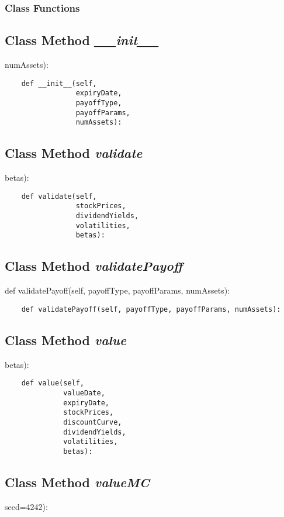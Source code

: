 \documentclass[twoside,11pt]{book}
\begin{document}
\subsubsection{Class Functions}

\subsection{Class Method {\it \_\_init\_\_}}
numAssets):

\begin{lstlisting}
    def __init__(self,
                 expiryDate,
                 payoffType,
                 payoffParams,
                 numAssets):
\end{lstlisting}

\subsection{Class Method {\it validate}}
betas):

\begin{lstlisting}
    def validate(self,
                 stockPrices,
                 dividendYields,
                 volatilities,
                 betas):
\end{lstlisting}

\subsection{Class Method {\it validatePayoff}}
def validatePayoff(self, payoffType, payoffParams, numAssets):

\begin{lstlisting}
    def validatePayoff(self, payoffType, payoffParams, numAssets):
\end{lstlisting}

\subsection{Class Method {\it value}}
betas):

\begin{lstlisting}
    def value(self, 
              valueDate, 
              expiryDate, 
              stockPrices, 
              discountCurve,
              dividendYields, 
              volatilities, 
              betas):
\end{lstlisting}

\subsection{Class Method {\it valueMC}}
seed=4242):
\end{document}
